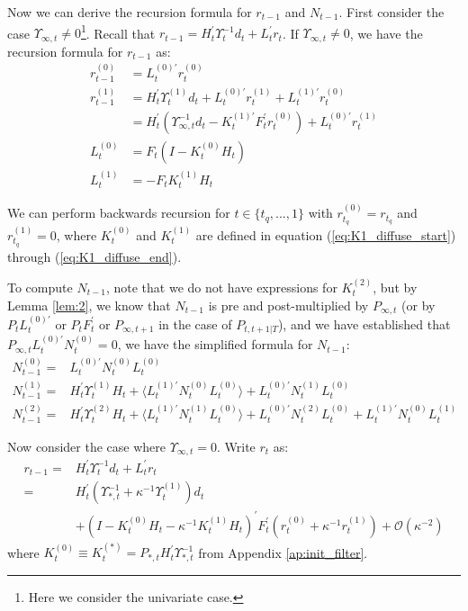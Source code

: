 \documentclass[10pt, titlepage]{article}
\numberwithin{equation}{section}
\begin{document}
Now we can derive the recursion formula for $r_{t-1}$ and $N_{t-1}$. First consider the case $\Upsilon_{\infty,t}\neq0$\footnote{Here we consider the univariate case.}. Recall that $r_{t-1} = H_t^{'}\Upsilon_{t}^{-1}d_t + L_t^{'}r_t$. If $\Upsilon_{\infty,t}\neq0$, we have the recursion formula for $r_{t-1}$ as:
\begin{align}
    r_{t-1}^{(0)} &= L_t^{(0)'}r_t^{(0)} \label{eq:r_inf_start} \\
    r_{t-1}^{(1)} &= H_t^{'}\Upsilon_{t}^{(1)}d_t+L_t^{(0)'}r_t^{(1)} + L_t^{(1)'}r_t^{(0)} \nonumber \\
        &= H_t^{'}(\Upsilon_{\infty,t}^{-1}d_t-K_t^{(1)'}F_t^{'}r_t^{(0)}) + L_t^{(0)'}r_t^{(1)} \label{eq:r_inf_end} \\
    L_t^{(0)} &= F_t(I-K_t^{(0)}H_t) \nonumber \\
    L_t^{(1)} &= -F_tK_t^{(1)}H_t \nonumber
\end{align}

We can perform backwards recursion for $t\in\{t_q,...,1\}$ with $r_{t_q}^{(0)}=r_{t_q}$ and $r_{t_q}^{(1)}=0$, where $K_t^{(0)}$ and $K_t^{(1)}$ are defined in equation (\ref{eq:K1_diffuse_start}) through (\ref{eq:K1_diffuse_end}). 

To compute $N_{t-1}$, note that we do not have expressions for $K_t^{(2)}$, but by Lemma \ref{lem:2}, we know that $N_{t-1}$ is pre and post-multiplied by $P_{\infty,t}$ (or by $P_{t}L_{t}^{(0)'}$ or $P_tF_t^{'}$ or $P_{\infty,t+1}$ in the case of $P_{t,t+1|T}$), and we have established that $P_{\infty,t}L_t^{(0)'}N_{t}^{(0)}=0$, we have the simplified formula for $N_{t-1}$:
\begin{align}
    N_{t-1}^{(0)} =& L_t^{(0)'}N_t^{(0)}L_t^{(0)} \label{eq:N_inf_start} \\
    N_{t-1}^{(1)} =& H_t^{'}\Upsilon_t^{(1)}H_t + \langle L_t^{(1)'}N_t^{(0)}L_t^{(0)}\rangle + L_t^{(0)'}N_t^{(1)}L_t^{(0)} \\
    N_{t-1}^{(2)} =& H_t^{'}\Upsilon_t^{(2)}H_t + \langle L_t^{(1)'}N_t^{(1)}L_t^{(0)}\rangle + L_t^{(0)'}N_t^{(2)}L_t^{(0)}
        + L_t^{(1)'}N_t^{(0)}L_t^{(1)} \label{eq:N_inf_end}
\end{align}

Now consider the case where $\Upsilon_{\infty,t}=0$. Write $r_t$ as:
\begin{align*}
    r_{t-1} =& H_t^{'}\Upsilon_t^{-1}d_t + L_t^{'}r_t \\
    =& H_t^{'}(\Upsilon_{*,t}^{-1}+\kappa^{-1}\Upsilon_t^{(1)})d_t \\
    &+(I-K_t^{(0)}H_t-\kappa^{-1}K_t^{(1)}H_t)^{'}F_t^{'}(r_t^{(0)}+\kappa^{-1}r_t^{(1)}) + \mathcal{O}(\kappa^{-2})
\end{align*}
where $K_t^{(0)}\equiv K_t^{(*)}=P_{*,t}H_t^{'}\Upsilon_{*,t}^{-1}$ from Appendix \ref{ap:init_filter}.
\end{document}
